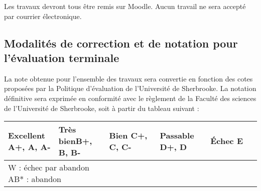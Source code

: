 \documentclass[12]{article}
\begin{document}
	Les travaux devront tous être remis sur Moodle. Aucun travail ne sera
	accepté par courrier électronique.

	\subsection*{Modalités de correction et de notation pour l'évaluation terminale}

	La note obtenue pour l’ensemble des travaux sera convertie en fonction des
	cotes proposées par la Politique d’évaluation de l’Université de Sherbrooke.
	La notation définitive sera exprimée en conformité avec le règlement de la
	Faculté des sciences de l’Université de Sherbrooke, soit à partir du tableau
	suivant :
	
	\begin{center}
		\begin{table}[h]
        \begin{tabular}{| p{0.2\linewidth} | p{0.2\linewidth} | p{0.2\linewidth} | p{0.2\linewidth} | p{0.2\linewidth} | } 
        \hline
        \textbf{Excellent} \linebreak A+, A, A- &
		\textbf{Très bien}\hfill\hfill \linebreak B+, B, B- & 
		\textbf{Bien} \linebreak C+, C, C- & 
		\textbf{Passable} \linebreak D+, D &
		\textbf{Échec} \linebreak E \\ [0.5ex] 
        \hline\hline
        \multicolumn{2}{l}{W : échec par abandon\hfill\hfill \linebreak
            AB* : abandon\hfill\hfill \linebreak} &

\end{tabular}
\end{table}
\end{center}
\end{document}
